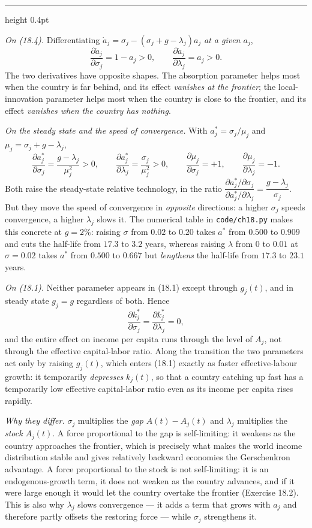 \documentclass[11pt,letterpaper,reqno]{amsart}
\makeatletter
\newcommand{\dt}[1]{\dot{#1}}
\newcommand{\as@head}[3]{%
  \par\addvspace{1.6ex}\penalty-200\relax
  \phantomsection
  \addcontentsline{toc}{subsection}{#1 #2\texorpdfstring{\ifx\relax#3\relax\else\quad #3\fi}{}}%
  {\color{RuleGrey}\hrule height 0.4pt}%
  \nobreak\vspace{0.8ex}\nobreak
  \noindent{\bfseries #1 #2}%
  \ifx\relax#3\relax\else\quad{\bfseries\itshape #3}\fi
  \par\nobreak\vspace{0.4ex}\nobreak
  \as@beginstatement
}
\newcommand{\as@beginstatement}{\begingroup\itshape\ignorespaces}
\newenvironment{aex}[2]{\as@head{Exercise}{#1}{#2}}{\par\addvspace{1.2ex}}
\newcommand{\bk}[1]{\textup{\textsc{#1}}}
\renewcommand{\as@beginstatement}{\ignorespaces}
\makeatother
\begin{document}
\begin{aex}{18.5}{}
\emph{On \bk{(18.4)}.}  Differentiating $\dt a_j=\sigma_j-(\sigma_j+g-\lambda_j)a_j$
\emph{at a given $a_j$},
\[
\boxed{\ \frac{\partial\dt a_j}{\partial\sigma_j}=1-a_j>0,
\qquad
\frac{\partial\dt a_j}{\partial\lambda_j}=a_j>0 . \ }
\]
The two derivatives have opposite shapes.  The absorption parameter helps most when the country
is far behind, and its effect \emph{vanishes at the frontier}; the local-innovation parameter
helps most when the country is close to the frontier, and its effect \emph{vanishes when the
country has nothing}.

\emph{On the steady state and the speed of convergence.}  With
$a^*_j=\sigma_j/\mu_j$ and $\mu_j=\sigma_j+g-\lambda_j$,
\[
\frac{\partial a^*_j}{\partial\sigma_j}=\frac{g-\lambda_j}{\mu_j^2}>0,
\qquad
\frac{\partial a^*_j}{\partial\lambda_j}=\frac{\sigma_j}{\mu_j^2}>0,
\qquad
\frac{\partial\mu_j}{\partial\sigma_j}=+1,
\qquad
\frac{\partial\mu_j}{\partial\lambda_j}=-1 .
\]
Both raise the steady-state relative technology, in the ratio
$\dfrac{\partial a^*_j/\partial\sigma_j}{\partial a^*_j/\partial\lambda_j}=\dfrac{g-\lambda_j}{\sigma_j}$.
But they move the speed of convergence in \emph{opposite} directions: a higher $\sigma_j$ speeds
convergence, a higher $\lambda_j$ slows it.  The numerical table in \texttt{code/ch18.py} makes
this concrete at $g=2\%$: raising $\sigma$ from $0.02$ to $0.20$ takes $a^*$ from $0.500$ to
$0.909$ and cuts the half-life from $17.3$ to $3.2$ years, whereas raising $\lambda$ from $0$ to
$0.01$ at $\sigma=0.02$ takes $a^*$ from $0.500$ to $0.667$ but \emph{lengthens} the half-life
from $17.3$ to $23.1$ years.

\emph{On \bk{(18.1)}.}  Neither parameter appears in \bk{(18.1)} except through $g_j(t)$, and in
steady state $g_j=g$ regardless of both.  Hence
\[
\frac{\partial k^*_j}{\partial\sigma_j}=\frac{\partial k^*_j}{\partial\lambda_j}=0 ,
\]
and the entire effect on income per capita runs through the level of $A_j$, not through the
effective capital-labor ratio.  Along the transition the two parameters act only by raising
$g_j(t)$, which enters \bk{(18.1)} exactly as faster effective-labour growth: it temporarily
\emph{depresses} $k_j(t)$, so that a country catching up fast has a temporarily low effective
capital-labor ratio even as its income per capita rises rapidly.

\emph{Why they differ.}  $\sigma_j$ multiplies the \emph{gap} $A(t)-A_j(t)$ and $\lambda_j$
multiplies the \emph{stock} $A_j(t)$.  A force proportional to the gap is self-limiting: it
weakens as the country approaches the frontier, which is precisely what makes the world income
distribution stable and gives relatively backward economies the Gerschenkron advantage.  A force
proportional to the stock is not self-limiting: it is an endogenous-growth term, it does not
weaken as the country advances, and if it were large enough it would let the country overtake the
frontier (Exercise 18.2).  This is also why $\lambda_j$ slows convergence --- it adds a term that
grows with $a_j$ and therefore partly offsets the restoring force --- while $\sigma_j$ strengthens
it.
\end{aex}
\end{document}
